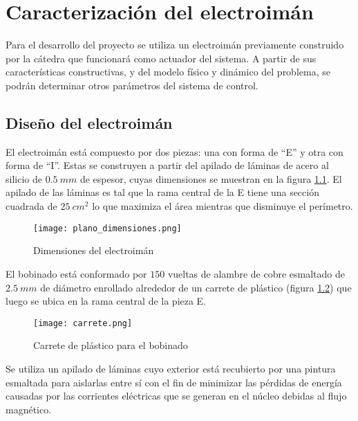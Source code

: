 \chapter{Caracterización del  electroimán}  \label{cap:CaracterizacionElectroiman}

\noindent Para el desarrollo del proyecto se utiliza un electroimán previamente construido por la cátedra que funcionará como actuador del sistema. A partir de sus características constructivas, y del modelo físico y dinámico del problema, se podrán determinar otros parámetros del sistema de control.

\section{Diseño del electroimán} \label{section_disenio_electroimán}



\noindent El electroimán está compuesto por dos piezas: una con forma de “E” y otra con forma de “I”. Estas se construyen a partir del apilado de láminas de acero al silicio de $0.5\:mm$ de espesor, cuyas dimensiones se muestran en la figura \ref{fig:img_plano_dimensiones}. El apilado de las láminas es tal que la rama central de la E tiene una sección cuadrada de $25\:cm^{2}$ lo que maximiza el área mientras que disminuye el perímetro.

\begin{figure}[H]
	\centering
	\texttt{[image: plano\_dimensiones.png]}
	\caption{Dimensiones del electroimán}
	\label{fig:img_plano_dimensiones}
\end{figure}

\noindent El bobinado está conformado por $150$ vueltas de alambre de cobre esmaltado de $2.5\:mm$ de diámetro enrollado alrededor de un carrete de plástico (figura \ref{fig:img_carrete}) que luego se ubica en la rama central de la pieza E.

\begin{figure}[H]
	\centering
	\texttt{[image: carrete.png]}
	\caption{Carrete de plástico para el bobinado}
	\label{fig:img_carrete}
\end{figure}


\noindent Se utiliza un apilado de láminas cuyo exterior está recubierto por una pintura esmaltada para aislarlas entre sí con el fin de minimizar las pérdidas de energía causadas por las corrientes eléctricas que se generan en el núcleo debidas al flujo magnético. 

